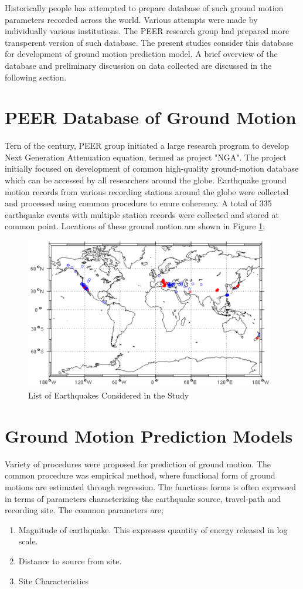 \documentclass[a4paper,10pt]{article}
\begin{document}
Historically people has attempted to prepare database of such ground motion parameters recorded across the world.
Various attempts were made by individually various institutions.
The PEER research group had prepared more transperent version of such database.
The present studies consider this database for development of ground motion prediction model.
A brief overview of the database and preliminary discussion on data collected are discussed in the following section.

\section{PEER Database of Ground Motion}
Tern of the century, PEER group initiated a large research program to develop Next Generation Attenuation equation, termed as project "NGA".
The project initially focused on development of common high-quality ground-motion database which can be accessed by all researchers around the globe.
Earthquake ground motion records from various recording stations around the globe were collected and processed using common procedure to enure coherency.
A total of 335 earthquake events with multiple station records were collected and stored at common point. Locations of these ground motion are shown in Figure \ref{NGA};

\begin{figure}[ht]
\centering
\includegraphics[height=6.6cm]{NGA_data}
\caption{List of Earthquakes Considered in the Study}
\label{NGA}
\end{figure}

\section{Ground Motion Prediction Models}
Variety of procedures were proposed for prediction of ground motion. 
The common procedure was empirical method, where functional form of ground motions are estimated through regression.
The functions forms is often expressed in terms of parameters characterizing the  earthquake source, travel-path and recording site.
The common parameters are;
\begin{enumerate}
	\item Magnitude of earthquake. This expresses quantity of energy released in log scale.
	\item Distance to source from site.
	\item Site Characteristics
\end{enumerate}
\end{document}
